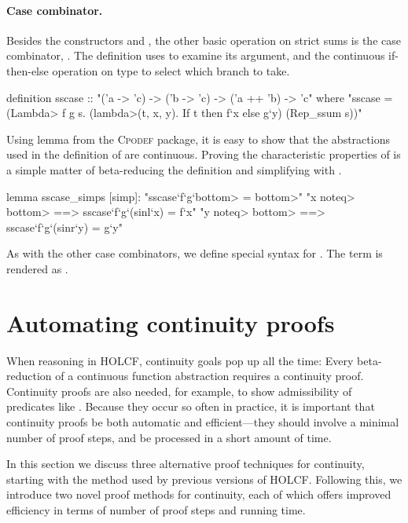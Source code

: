 \paragraph{Case combinator.} Besides the constructors  and , the other basic operation on strict sums is the case combinator, . The definition uses  to examine its argument, and the continuous if-then-else operation on type  to select which branch to take.
\begin{isacode}
definition sscase :: "('a -> 'c) -> ('b -> 'c) -> ('a ++ 'b) -> 'c"
  where "sscase = (\<Lambda> f g s. (\<lambda>(t, x, y). If t then f`x else g`y) (Rep_ssum s))"
\end{isacode}
Using lemma  from the \textsc{Cpodef} package, it is easy to show that the abstractions used in the definition of  are continuous. Proving the characteristic properties of  is a simple matter of beta-reducing the definition and simplifying with .
\begin{isacode}
lemma sscase_simps [simp]:
  "sscase`f`g`\<bottom> = \<bottom>"
  "x \<noteq> \<bottom> ==> sscase`f`g`(sinl`x) = f`x"
  "y \<noteq> \<bottom> ==> sscase`f`g`(sinr`y) = g`y"
\end{isacode}
As with the other case combinators, we define special syntax for . The term  is rendered as .



\section{Automating continuity proofs}
\label{sec:holcf-automation}

When reasoning in HOLCF, continuity goals pop up all the time: Every beta-reduction of a continuous function abstraction requires a continuity proof. Continuity proofs are also needed, for example, to show admissibility of predicates like . Because they occur so often in practice, it is important that continuity proofs be both automatic and efficient---they should involve a minimal number of proof steps, and be processed in a short amount of time.

In this section we discuss three alternative proof techniques for continuity, starting with the method used by previous versions of HOLCF. Following this, we introduce two novel proof methods for continuity, each of which offers improved efficiency in terms of number of proof steps and running time.

